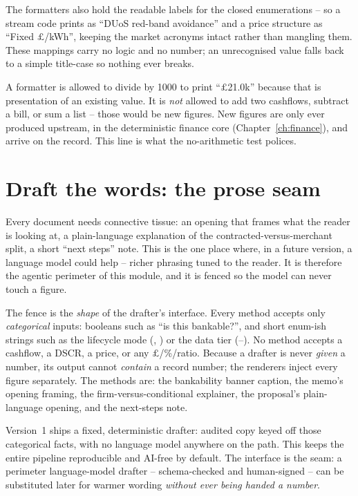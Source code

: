 The formatters also hold the readable labels for the closed enumerations -- so a stream code prints as ``DUoS red-band avoidance'' and a price structure as ``Fixed \(\pounds\)/kWh'', keeping the market acronyms intact rather than mangling them. These mappings carry no logic and no number; an unrecognised value falls back to a simple title-case so nothing ever breaks.

\begin{keyidea}
A formatter is allowed to divide by 1000 to print ``\(\pounds\)21.0k'' because that is presentation of an existing value. It is \emph{not} allowed to add two cashflows, subtract a bill, or sum a list -- those would be new figures. New figures are only ever produced upstream, in the deterministic finance core (Chapter~\ref{ch:finance}), and arrive on the record. This line is what the no-arithmetic test polices.
\end{keyidea}

\section{Draft the words: the prose seam}

Every document needs connective tissue: an opening that frames what the reader is looking at, a plain-language explanation of the contracted-versus-merchant split, a short ``next steps'' note. This is the one place where, in a future version, a language model could help -- richer phrasing tuned to the reader. It is therefore the agentic perimeter of this module, and it is fenced so the model can never touch a figure.

The fence is the \emph{shape} of the drafter's interface. Every method accepts only \emph{categorical} inputs: booleans such as ``is this bankable?'', and short enum-ish strings such as the lifecycle mode (, ) or the data tier (--). No method accepts a cashflow, a DSCR, a price, or any \(\pounds\)/\%/ratio. Because a drafter is never \emph{given} a number, its output cannot \emph{contain} a record number; the renderers inject every figure separately. The methods are: the bankability banner caption, the memo's opening framing, the firm-versus-conditional explainer, the proposal's plain-language opening, and the next-steps note.

Version~1 ships a fixed, deterministic drafter: audited copy keyed off those categorical facts, with no language model anywhere on the path. This keeps the entire pipeline reproducible and AI-free by default. The interface is the seam: a perimeter language-model drafter -- schema-checked and human-signed -- can be substituted later for warmer wording \emph{without ever being handed a number}.

